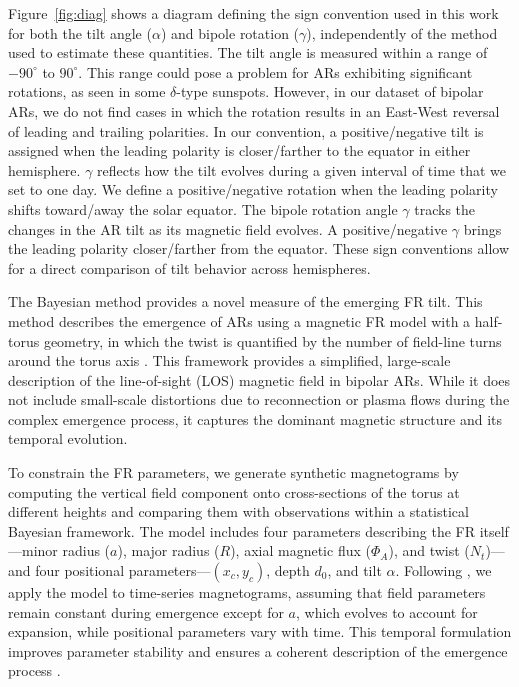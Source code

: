 \documentclass[namedreferences,hyperref,optionalrh]{spr-sola}
\newcommand{\pc}[1]{{\color{ForestGreen}{P comment: #1}}}
\begin{document}
Figure~\ref{fig:diag} shows a diagram defining the sign convention used in this work for both the tilt angle ($\alpha$) and bipole rotation ($\gamma$), independently of the method used to estimate these quantities. The tilt angle is measured within a range of $-90^\circ$ to $90^\circ$. This range could pose a problem for ARs exhibiting significant rotations, as seen in some $\delta$-type sunspots. However, in our dataset of bipolar ARs, we do not find cases in which the rotation results in an East-West reversal of leading and trailing polarities. In our convention, a positive/negative tilt is assigned when the leading polarity is closer/farther to the equator in either hemisphere.
$\gamma$ reflects how the tilt evolves during a given interval of time that we set to one day. 
We define a positive/negative rotation when the leading polarity shifts toward/away the solar equator. 
The bipole rotation angle $\gamma$ tracks the changes in the AR tilt as its magnetic field evolves. A positive/negative $\gamma$ brings the leading polarity closer/farther from the equator.
These sign conventions allow for a direct comparison of tilt behavior across hemispheres.

The Bayesian method %
provides a novel measure of the emerging FR tilt.
This method describes the emergence of ARs using a magnetic FR model with a half-torus geometry, in which the twist is quantified by the number of field-line turns around the torus axis \citep[see][]{Poisson22, Poisson24}. This framework provides a simplified, large-scale description of the line-of-sight (LOS) magnetic field in bipolar ARs. While it does not include small-scale distortions due to reconnection or plasma flows during the complex emergence process, it captures the dominant magnetic structure and its temporal evolution.

To constrain the FR parameters, we generate synthetic magnetograms by computing the vertical field component onto cross-sections of the torus at different heights and comparing them with observations within a statistical Bayesian framework. The model includes four parameters describing the FR itself—minor radius ($a$), major radius ($R$), axial magnetic flux ($\Phi_A$), and twist ($N_t$)—and four positional parameters—$(x_c,y_c)$, depth $d_0$, and tilt $\alpha$. Following \citet{Poisson24}, we apply the model to time-series magnetograms, assuming that field parameters remain constant during emergence except for $a$, which evolves to account for expansion, while positional parameters vary with time. This temporal formulation improves parameter stability and ensures a coherent description of the emergence process \citep[see also][]{Poisson25}.
\end{document}

